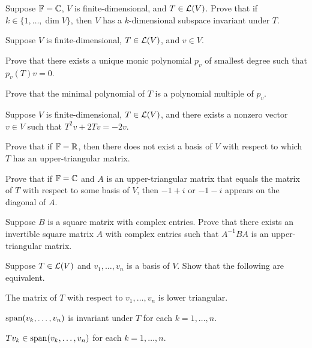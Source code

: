 \begin{exc}
\begin{exercise}
Suppose $\mathbb{F}=\mathbb{C}$, $V$ is finite-dimensional, and $T\in\mathcal{L}(V)$. Prove that if
$k\in\{1,\dots,\dim V\}$, then $V$ has a $k$-dimensional subspace invariant under
$T$.
\end{exercise}

\begin{exercise}
Suppose $V$ is finite-dimensional, $T\in\mathcal{L}(V)$, and $v\in V$.
\begin{parts}
\item Prove that there exists a unique monic polynomial $p_v$ of smallest degree
  such that $p_v(T)v=0$.
\item Prove that the minimal polynomial of $T$ is a polynomial multiple of $p_v$.
\end{parts}
\end{exercise}

\begin{exercise}
Suppose $V$ is finite-dimensional, $T\in\mathcal{L}(V)$, and there exists a nonzero
vector $v\in V$ such that $T^2v+2Tv=-2v$.
\begin{parts}
\item Prove that if $\mathbb{F}=\mathbb{R}$, then there does not exist a basis of $V$ with
  respect to which $T$ has an upper-triangular matrix.
\item Prove that if $\mathbb{F}=\mathbb{C}$ and $A$ is an upper-triangular matrix that equals the
  matrix of $T$ with respect to some basis of $V$, then $-1+i$ or $-1-i$ appears
  on the diagonal of $A$.
\end{parts}
\end{exercise}

\begin{exercise}
Suppose $B$ is a square matrix with complex entries. Prove that there exists an
invertible square matrix $A$ with complex entries such that $A^{-1}BA$ is an
upper-triangular matrix.
\end{exercise}

\begin{exercise}
Suppose $T\in\mathcal{L}(V)$ and $v_1,\dots,v_n$ is a basis of $V$. Show that the
following are equivalent.
\begin{parts}
\item The matrix of $T$ with respect to $v_1,\dots,v_n$ is lower triangular.
\item $\operatorname{span}(v_k,\dots,v_n)$ is invariant under $T$ for each $k=1,\dots,n$.
\item $Tv_k\in\operatorname{span}(v_k,\dots,v_n)$ for each $k=1,\dots,n$.
\end{parts}
\end{exercise}


\end{exc}

